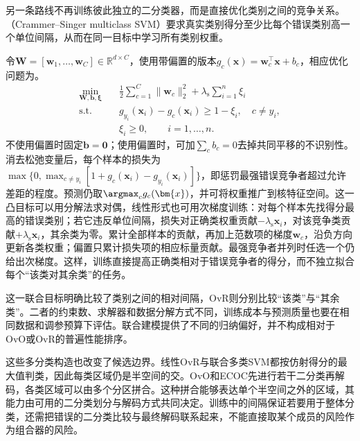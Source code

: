 另一条路线不再训练彼此独立的二分类器，而是直接优化类别之间的竞争关系。（Crammer--Singer multiclass SVM）要求真实类别得分至少比每个错误类别高一个单位间隔，从而在同一目标中学习所有类别权重。

令$\bm{W}=[\bm{w}_1,\ldots,\bm{w}_C]\in\mathbb{R}^{d\times C}$，使用带偏置的版本$g_c(\bm{x})=\bm{w}_c^{\top}\bm{x}+b_c$，相应优化问题为。
\begin{equation}
  \begin{aligned}
    \min_{\bm{W},\bm{b},\bm{\xi}}\quad&
      \frac12\sum_{c=1}^C\lVert\bm{w}_c\rVert_2^2
       +\lambda_{\mathrm{s}}\sum_{i=1}^n\xi_i\\
    \text{s.t.}\quad&
      g_{y_i}(\bm{x}_i)-g_c(\bm{x}_i)\ge1-\xi_i,
      \quad c\ne y_i,\\
    &\xi_i\ge0,\qquad i=1,\ldots,n.
  \end{aligned}
  \label{eq:classification-svm-crammer-singer}
\end{equation}
不使用偏置时固定$\bm{b}=\bm{0}$；使用偏置时，可加$\sum_c b_c=0$去掉共同平移的不识别性。消去松弛变量后，每个样本的损失为$\max\{0,\max_{c\ne y_i}[1+g_c(\bm{x}_i)-g_{y_i}(\bm{x}_i)]\}$，即惩罚最强错误竞争者超过允许差距的程度。预测仍取$\argmax_c g_c(\bm{x})$，并可将权重推广到核特征空间。这一凸目标可以用分解法求对偶，线性形式也可用次梯度训练：对每个样本先找得分最高的错误类别；若它违反单位间隔，损失对正确类权重贡献$-\lambda_{\mathrm s}\bm x_i$，对该竞争类贡献$+\lambda_{\mathrm s}\bm x_i$，其余类为零。累计全部样本的贡献，再加上范数项的梯度$\bm w_c$，沿负方向更新各类权重；偏置只累计损失项的相应标量贡献。最强竞争者并列时任选一个仍给出次梯度。这样，训练直接提高正确类相对于错误竞争者的得分，而不独立拟合每个“该类对其余类”的任务。

这一联合目标明确比较了类别之间的相对间隔，OvR则分别比较“该类”与“其余类”。二者的约束数、求解器和数据分解方式不同，训练成本与预测质量也要在相同数据和调参预算下评估。联合建模提供了不同的归纳偏好，并不构成相对于OvO或OvR的普遍性能排序。

这些多分类构造也改变了候选边界。线性OvR与联合多类SVM都按仿射得分的最大值判类，因此每类区域仍是半空间的交。OvO和ECOC先进行若干二分类再解码，各类区域可以由多个分区拼合。这种拼合能够表达单个半空间之外的区域，其能力由可用的二分类划分与解码方式共同决定。训练中的间隔保证若要用于整体分类，还需把错误的二分类比较与最终解码联系起来，不能直接取某个成员的风险作为组合器的风险。


